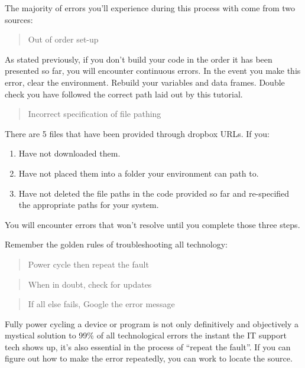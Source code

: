 \documentclass[
  11,
]{book}
\begin{document}
The majority of errors you'll experience during this process with come from two sources:

\begin{quote}
Out of order set-up
\end{quote}

As stated previously, if you don't build your code in the order it has been presented so far, you will encounter continuous errors. In the event you make this error, clear the environment. Rebuild your variables and data frames. Double check you have followed the correct path laid out by this tutorial.

\begin{quote}
Incorrect specification of file pathing
\end{quote}

There are 5 files that have been provided through dropbox URLs. If you:

\begin{enumerate}
\def\labelenumi{\arabic{enumi})}
\item
  Have not downloaded them.
\item
  Have not placed them into a folder your environment can path to.
\item
  Have not deleted the file paths in the code provided so far and re-specified the appropriate paths for your system.
\end{enumerate}

You will encounter errors that won't resolve until you complete those three steps.

Remember the golden rules of troubleshooting all technology:

\begin{quote}
Power cycle then repeat the fault
\end{quote}

\begin{quote}
When in doubt, check for updates
\end{quote}

\begin{quote}
If all else fails, Google the error message
\end{quote}

Fully power cycling a device or program is not only definitively and objectively a mystical solution to 99\% of all technological errors the instant the IT support tech shows up, it's also essential in the process of ``repeat the fault''. If you can figure out how to make the error repeatedly, you can work to locate the source.
\end{document}
